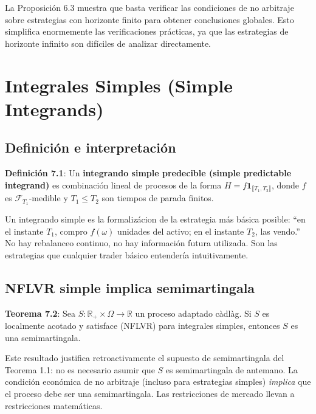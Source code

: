 \documentclass[12pt]{article}
\begin{document}
\begin{intuicion}
La Proposici\'on 6.3 muestra que basta verificar las condiciones de no arbitraje sobre estrategias con horizonte finito para obtener conclusiones globales. Esto simplifica enormemente las verificaciones pr\'acticas, ya que las estrategias de horizonte infinito son dif\'iciles de analizar directamente.
\end{intuicion}

\section{Integrales Simples (Simple Integrands)}

\subsection{Definici\'on e interpretaci\'on}

\textbf{Definici\'on 7.1}: Un \textbf{integrando simple predecible (simple predictable integrand)} es combinaci\'on lineal de procesos de la forma $H = f \mathbf{1}_{\llbracket T_1, T_2 \rrbracket}$, donde $f$ es $\mathscr{F}_{T_1}$-medible y $T_1 \leq T_2$ son tiempos de parada finitos.

\begin{intuicion}
Un integrando simple es la formaliz\'acion de la estrategia m\'as b\'asica posible: ``en el instante $T_1$, compro $f(\omega)$ unidades del activo; en el instante $T_2$, las vendo.'' No hay rebalanceo continuo, no hay informaci\'on futura utilizada. Son las estrategias que cualquier trader b\'asico entender\'ia intuitivamente.
\end{intuicion}

\subsection{NFLVR simple implica semimartingala}

\textbf{Teorema 7.2}: Sea $S : \mathbb{R}_+ \times \Omega \to \mathbb{R}$ un proceso adaptado c\`adl\`ag. Si $S$ es localmente acotado y satisface (NFLVR) para integrales simples, entonces $S$ es una semimartingala.

\begin{intuicion}
Este resultado justifica retroactivamente el supuesto de semimartingala del Teorema 1.1: no es necesario asumir que $S$ es semimartingala de antemano. La condici\'on econ\'omica de no arbitraje (incluso para estrategias simples) \emph{implica} que el proceso debe ser una semimartingala. Las restricciones de mercado llevan a restricciones matem\'aticas.
\end{intuicion}
\end{document}
